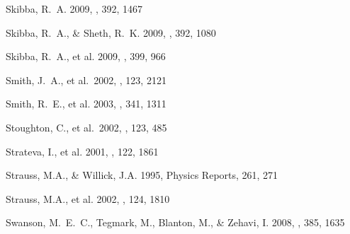 \documentclass[]{emulateapj}
\begin{document}
\begin{thebibliography}{999}
Skibba, R.\ A. 2009, \mnras, 392, 1467

Skibba, R.~A., \& Sheth, R.~K. 2009, \mnras, 392, 1080 

Skibba, R.\ A., et al. 2009,
\mnras, 399, 966  %


Smith, J.\ A., et al.\ 2002, \aj, 123, 2121

Smith, R.\ E., et al. 2003, \mnras, 341, 1311




Stoughton, C., et al.\ 2002, \aj, 123, 485

Strateva, I., et al. 2001, \aj, 122, 1861

Strauss, M.A., \& Willick, J.A. 1995, Physics Reports, 261, 271 

Strauss, M.A., et al. 2002, \aj, 124, 1810

Swanson, M.\ E.\ C., Tegmark, M., Blanton, M., \& Zehavi, I. 2008,
\mnras, 385, 1635


\end{thebibliography}
\end{document}
